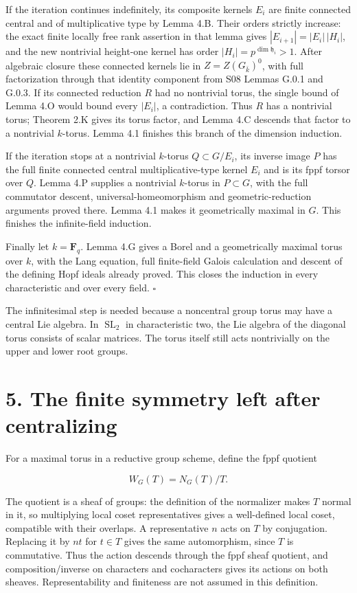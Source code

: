 \documentclass[11pt,a4paper,openany]{report}
\begin{document}
If the iteration continues indefinitely, its composite kernels \(E_i\) are finite connected central and of multiplicative type by Lemma 4.B. Their orders strictly increase: the exact finite locally free rank assertion in that lemma gives \(|E_{i+1}|=|E_i|\,|H_i|\), and the new nontrivial height-one kernel has order \(|H_i|=p^{\dim\mathfrak h_i}>1\). After algebraic closure these connected kernels lie in \(Z=Z(G_{\bar k})^0\), with full factorization through that identity component from S08 Lemmas G.0.1 and G.0.3. If its connected reduction \(R\) had no nontrivial torus, the single bound of Lemma 4.O would bound every \(|E_i|\), a contradiction. Thus \(R\) has a nontrivial torus; Theorem 2.K gives its torus factor, and Lemma 4.C descends that factor to a nontrivial \(k\)-torus. Lemma 4.1 finishes this branch of the dimension induction.

If the iteration stops at a nontrivial \(k\)-torus \(Q\subset G/E_i\), its inverse image \(P\) has the full finite connected central multiplicative-type kernel \(E_i\) and is its fppf torsor over \(Q\). Lemma 4.P supplies a nontrivial \(k\)-torus in \(P\subset G\), with the full commutator descent, universal-homeomorphism and geometric-reduction arguments proved there. Lemma 4.1 makes it geometrically maximal in \(G\). This finishes the infinite-field induction.

Finally let \(k=\mathbf F_q\). Lemma 4.G gives a Borel and a geometrically maximal torus over \(k\), with the Lang equation, full finite-field Galois calculation and descent of the defining Hopf ideals already proved. This closes the induction in every characteristic and over every field. \(\square\)

The infinitesimal step is needed because a noncentral group torus may have a central Lie algebra. In \(\operatorname{SL}_2\) in characteristic two, the Lie algebra of the diagonal torus consists of scalar matrices. The torus itself still acts nontrivially on the upper and lower root groups.

\section{5. The finite symmetry left after centralizing}\label{AG-RG-01-the-finite-symmetry-left-after-centralizing}

For a maximal torus in a reductive group scheme, define the fppf quotient

\[
W_G(T)=N_G(T)/T.
\]

The quotient is a sheaf of groups: the definition of the normalizer makes \(T\) normal in it, so multiplying local coset representatives gives a well-defined local coset, compatible with their overlaps. A representative \(n\) acts on \(T\) by conjugation. Replacing it by \(nt\) for \(t\in T\) gives the same automorphism, since \(T\) is commutative. Thus the action descends through the fppf sheaf quotient, and composition/inverse on characters and cocharacters gives its actions on both sheaves. Representability and finiteness are not assumed in this definition.
\end{document}
